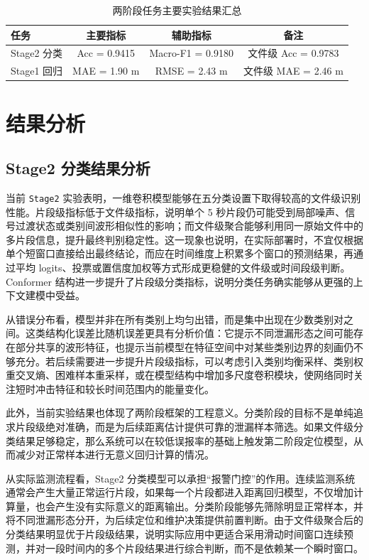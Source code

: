 \begin{table}[!htbp]
  \centering
  \caption{两阶段任务主要实验结果汇总}
  \label{tab:main_results}
  \vspace{0.5em}
  \wuhao
  \begin{tabular}{lccc}
    \toprule
    任务 & 主要指标 & 辅助指标 & 备注 \\
    \midrule
    Stage2 分类 & Acc = 0.9415 & Macro-F1 = 0.9180 & 文件级 Acc = 0.9783 \\
    Stage1 回归 & MAE = 1.90 m & RMSE = 2.43 m & 文件级 MAE = 2.46 m \\
    \bottomrule
  \end{tabular}
\end{table}

\section{结果分析}

\subsection{Stage2 分类结果分析}

当前 \texttt{Stage2} 实验表明，一维卷积模型能够在五分类设置下取得较高的文件级识别性能。片段级指标低于文件级指标，说明单个 5 秒片段仍可能受到局部噪声、信号过渡状态或类别间波形相似性的影响；而文件级聚合能够利用同一原始文件中的多片段信息，提升最终判别稳定性。这一现象也说明，在实际部署时，不宜仅根据单个短窗口直接给出最终结论，而应在时间维度上积累多个窗口的预测结果，再通过平均 logits、投票或置信度加权等方式形成更稳健的文件级或时间段级判断。Conformer 结构进一步提升了片段级分类指标，说明分类任务确实能够从更强的上下文建模中受益。

从错误分布看，模型并非在所有类别上均匀出错，而是集中出现在少数类别对之间。这类结构化误差比随机误差更具有分析价值：它提示不同泄漏形态之间可能存在部分共享的波形特征，也提示当前模型在特征空间中对某些类别边界的刻画仍不够充分。若后续需要进一步提升片段级指标，可以考虑引入类别均衡采样、类别权重交叉熵、困难样本重采样，或在模型结构中增加多尺度卷积模块，使网络同时关注短时冲击特征和较长时间范围内的能量变化。

此外，当前实验结果也体现了两阶段框架的工程意义。分类阶段的目标不是单纯追求片段级绝对准确，而是为后续距离估计提供可靠的泄漏样本筛选。如果文件级分类结果足够稳定，那么系统可以在较低误报率的基础上触发第二阶段定位模型，从而减少对正常样本进行无意义回归计算的情况。

从实际监测流程看，Stage2 分类模型可以承担“报警门控”的作用。连续监测系统通常会产生大量正常运行片段，如果每一个片段都进入距离回归模型，不仅增加计算量，也会产生没有实际意义的距离输出。分类阶段能够先筛除明显正常样本，并将不同泄漏形态分开，为后续定位和维护决策提供前置判断。由于文件级聚合后的分类结果明显优于片段级结果，说明实际应用中更适合采用滑动时间窗口连续预测，并对一段时间内的多个片段结果进行综合判断，而不是依赖某一个瞬时窗口。

